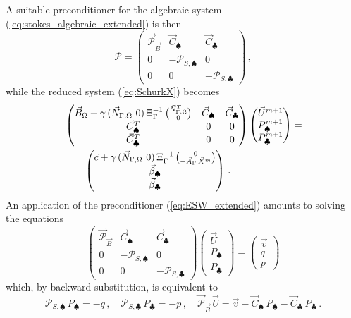A suitable preconditioner for the algebraic system
(\ref{eq:stokes_algebraic_extended}) is then
\begin{equation} \label{eq:ESW_extended}
\mathcal{P} = \begin{pmatrix}
\vec{\mathcal{P}}_{\vec B} & \vec C_\spadesuit & \vec C_\clubsuit \\
0 & -\mathcal{P}_{S,\spadesuit} & 0 \\
0 & 0 &-\mathcal{P}_{S,\clubsuit}
\end{pmatrix}\,,
\end{equation}
while the reduced system (\ref{eq:SchurkX}) becomes
\begin{align}\label{eq:SchurkX_extended}
&
\begin{pmatrix}
\vec B_\Omega + \gamma\,(\Nbulk \ 0)\,\Xi_\Gamma^{-1}\,\binom{\NbulkT}{0} &
\vec C_\spadesuit & \vec C_\clubsuit \\
\vec C^T_\spadesuit & 0 & 0 \\
\vec C^T_\clubsuit & 0 & 0 \\
\end{pmatrix}
\begin{pmatrix}
\vec U^{m+1} \\
P^{m+1}_\spadesuit \\
P^{m+1}_\clubsuit
\end{pmatrix}
= \nonumber \\
& \qquad
\begin{pmatrix}
\vec c+\gamma\,(\Nbulk \ 0)\,
\Xi_\Gamma^{-1}\,\binom{0}{-\vec A_\Gamma\,\vec X^m} \\
\vec \beta_\spadesuit \\
\vec \beta_\clubsuit
\end{pmatrix}\,.
\end{align}
An application of the preconditioner (\ref{eq:ESW_extended}) amounts to solving
the equations
\begin{equation*}
\begin{pmatrix}
\vec{\mathcal{P}}_{\vec B} & \vec C_\spadesuit & \vec C_\clubsuit \\
0 & -\mathcal{P}_{S,\spadesuit} & 0 \\
0 & 0 &-\mathcal{P}_{S,\clubsuit}
\end{pmatrix}
\begin{pmatrix}
\vec U \\
P_\spadesuit \\
P_\clubsuit
\end{pmatrix}
=
\begin{pmatrix}
\vec v \\
q \\
p
\end{pmatrix}
\end{equation*}
which, by backward substitution, is equivalent to
\begin{equation}\label{eq:blocksolution_extended}
\mathcal{P}_{S,\spadesuit}\,P_\spadesuit =
-q\,,\quad \mathcal{P}_{S,\clubsuit}\,P_\clubsuit =
-p\,,\quad \vec{\mathcal{P}}_{\vec B}\,\vec U =
\vec v - \vec C_\spadesuit\,P_\spadesuit - \vec C_\clubsuit\,P_\clubsuit\,.
\end{equation}

